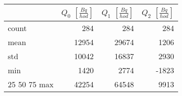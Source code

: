 \begin{tabular}{lrrr}
\toprule
{} &  $Q_0$ $\left[\si{\frac{Bq}{hod}}\right]$ &  $Q_1$ $\left[\si{\frac{Bq}{hod}}\right]$ &  $Q_2$ $\left[\si{\frac{Bq}{hod}}\right]$ \\
\midrule
count &                                       284 &                                       284 &                                       284 \\
mean  &                                     12954 &                                     29674 &                                      1206 \\
std   &                                     10042 &                                     16837 &                                      2930 \\
min   &                                      1420 &                                      2774 &                                     -1823 \\
25%
50%
75%
max   &                                     42254 &                                     64548 &                                      9913 \\
\bottomrule
\end{tabular}
